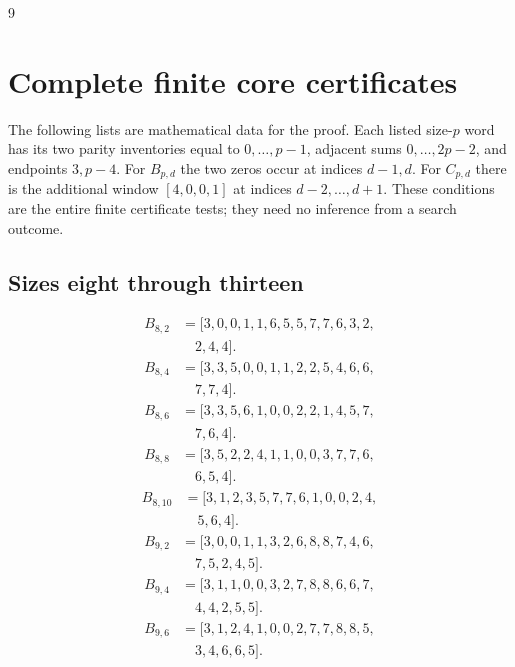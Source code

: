 \documentclass[11pt,a4paper]{article}
\theoremstyle{definition}\newtheorem{definition}[theorem]{Definition}
\theoremstyle{remark}\newtheorem{remark}[theorem]{Remark}
\begin{document}
\begin{thebibliography}{9}
\end{thebibliography}

\appendix
\section{Complete finite core certificates}\label{app:cores}
The following lists are mathematical data for the proof. Each listed size-$p$
word has its two parity inventories equal to $0,\ldots,p-1$, adjacent sums
$0,\ldots,2p-2$, and endpoints $3,p-4$. For $B_{p,d}$ the two zeros occur
at indices $d-1,d$. For $C_{p,d}$ there is the additional window
$[4,0,0,1]$ at indices $d-2,\ldots,d+1$. These conditions are the entire
finite certificate tests; they need no inference from a search outcome.
\subsection{Sizes eight through thirteen}
\[\begin{aligned}
B_{8,2}&=[3,0,0,1,1,6,5,5,7,7,6,3,2,\\
&\quad 2,4,4].
\end{aligned}\]
\[\begin{aligned}
B_{8,4}&=[3,3,5,0,0,1,1,2,2,5,4,6,6,\\
&\quad 7,7,4].
\end{aligned}\]
\[\begin{aligned}
B_{8,6}&=[3,3,5,6,1,0,0,2,2,1,4,5,7,\\
&\quad 7,6,4].
\end{aligned}\]
\[\begin{aligned}
B_{8,8}&=[3,5,2,2,4,1,1,0,0,3,7,7,6,\\
&\quad 6,5,4].
\end{aligned}\]
\[\begin{aligned}
B_{8,10}&=[3,1,2,3,5,7,7,6,1,0,0,2,4,\\
&\quad 5,6,4].
\end{aligned}\]
\[\begin{aligned}
B_{9,2}&=[3,0,0,1,1,3,2,6,8,8,7,4,6,\\
&\quad 7,5,2,4,5].
\end{aligned}\]
\[\begin{aligned}
B_{9,4}&=[3,1,1,0,0,3,2,7,8,8,6,6,7,\\
&\quad 4,4,2,5,5].
\end{aligned}\]
\[\begin{aligned}
B_{9,6}&=[3,1,2,4,1,0,0,2,7,7,8,8,5,\\
&\quad 3,4,6,6,5].
\end{aligned}\]
\end{document}

